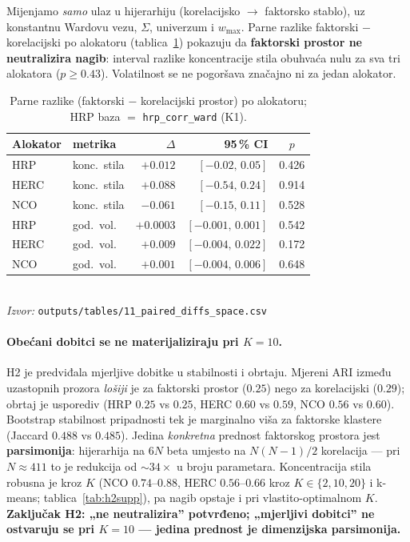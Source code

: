 \documentclass[11pt]{article}
\newcommand{\izvor}[1]{{\footnotesize\textit{Izvor:} \texttt{#1}}}
\begin{document}
Mijenjamo \emph{samo} ulaz u hijerarhiju (korelacijsko $\rightarrow$ faktorsko
stablo), uz konstantnu Wardovu vezu, $\Sigma$, univerzum i $w_{\max}$. Parne
razlike faktorski $-$ korelacijski po alokatoru (tablica~\ref{tab:h2}) pokazuju da
\textbf{faktorski prostor ne neutralizira nagib}: interval razlike koncentracije
stila obuhvaća nulu za sva tri alokatora ($p\ge 0.43$). Volatilnost se ne
pogoršava značajno ni za jedan alokator.

\begin{table}[!htbp]
  \centering
  \caption{Parne razlike (faktorski $-$ korelacijski prostor) po alokatoru;
  HRP baza $=$ \texttt{hrp\_corr\_ward} (K1).}
  \label{tab:h2}
  \small
  \begin{tabular}{llrrc}
    \toprule
    Alokator & metrika & $\Delta$ & 95\,\% CI & $p$ \\
    \midrule
    HRP  & konc.\ stila & $+0.012$ & $[-0.02,\,0.05]$ & 0.426 \\
    HERC & konc.\ stila & $+0.088$ & $[-0.54,\,0.24]$ & 0.914 \\
    NCO  & konc.\ stila & $-0.061$ & $[-0.15,\,0.11]$ & 0.528 \\
    HRP  & god.\ vol.   & $+0.0003$ & $[-0.001,\,0.001]$ & 0.542 \\
    HERC & god.\ vol.   & $+0.009$ & $[-0.004,\,0.022]$ & 0.172 \\
    NCO  & god.\ vol.   & $+0.001$ & $[-0.004,\,0.006]$ & 0.648 \\
    \bottomrule
  \end{tabular}\\[0.3em]
  \izvor{outputs/tables/11\_paired\_diffs\_space.csv}
\end{table}

\paragraph{Obećani dobitci se ne materijaliziraju pri $K=10$.} H2 je predviđala
mjerljive dobitke u stabilnosti i obrtaju. Mjereni ARI između uzastopnih prozora
\emph{lošiji} je za faktorski prostor ($0.25$) nego za korelacijski ($0.29$);
obrtaj je usporediv (HRP $0.25$ vs $0.25$, HERC $0.60$ vs $0.59$, NCO $0.56$ vs
$0.60$). Bootstrap stabilnost pripadnosti tek je marginalno viša za faktorske
klastere (Jaccard $0.488$ vs $0.485$). Jedina \emph{konkretna} prednost faktorskog
prostora jest \textbf{parsimonija}: hijerarhija na $6N$ beta umjesto na $N(N-1)/2$
korelacija --- pri $N\approx 411$ to je redukcija od $\sim 34\times$ u broju
parametara. Koncentracija stila robusna je kroz $K$ (NCO $0.74$--$0.88$, HERC
$0.56$--$0.66$ kroz $K\in\{2,10,20\}$ i k-means; tablica~\ref{tab:h2supp}), pa
nagib opstaje i pri vlastito-optimalnom $K$. \textbf{Zaključak H2: „ne
neutralizira'' potvrđeno; „mjerljivi dobitci'' ne ostvaruju se pri $K=10$ ---
jedina prednost je dimenzijska parsimonija.}
\end{document}
